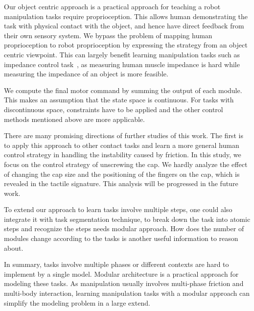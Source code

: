 Our object centric approach is a practical approach for teaching a robot manipulation tasks require proprioception. This allows human demonstrating the task with physical contact with the object, and hence have direct feedback from their own sensory system. We bypass the problem of mapping human proprioception to robot proprioception by expressing the strategy from an object centric viewpoint. This can largely benefit learning manipulation tasks such as impedance control task~\cite{Miao2014}, as measuring human muscle impedance is hard while measuring the impedance of an object is more feasible.

We compute the final motor command by summing the output of each module. This makes an assumption that the state space is continuous. For tasks with discontinuous space, constraints have to be applied and the other control methods mentioned above are more applicable.

There are many promising directions of further studies of this work. The first is to apply this approach to other contact tasks and learn a more general human control strategy in handling the instability caused by friction.
In this study, we focus on the control strategy of unscrewing the cap. We hardly analyze the effect of changing the cap size and the positioning of the fingers on the cap, which is revealed in the tactile signature. This analysis will be progressed in the future work.

To extend our approach to learn tasks involve multiple steps, one could also integrate it with task segmentation technique, to break down the task into atomic steps and recognize the steps needs modular approach. How does the number of modules change according to the tasks is another useful information to reason about.


In summary, tasks involve multiple phases or different contexts are hard to implement by a single model. Modular architecture is a practical approach for modeling these tasks. As manipulation usually involves multi-phase friction and multi-body interaction, learning manipulation tasks with a modular approach can simplify the modeling problem in a large extend.

